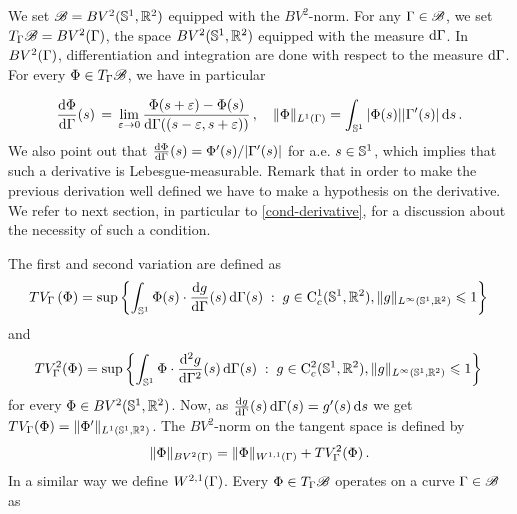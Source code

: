 \begin{defn}[{\bf $BV^2$-curves}]\label{BV2curves}
We set $\mathcal{B} = BV^2( \mathbb{S}^1, {\mathbb R}^2)$ equipped with the  $BV^2$-norm.
For any $\Gamma \in \mathcal{B}$, we set $T_\Gamma \mathcal{B} = BV^2(\Gamma)$, the space $BV^2(\mathbb{S}^1,\mathbb{R}^2)$ equipped with the measure  $\mathrm{d}\Gamma$.
In $BV^2(\Gamma)$, differentiation and integration are done with respect to the measure $\mathrm{d}\Gamma$. For every $\Phi \in T_\Gamma \mathcal{B}$, we have  in particular 

$$\frac{\mathrm{d} \Phi}{\mathrm{d} \Gamma}(s)\,=\, \underset{\varepsilon \rightarrow 0}{\lim} \, \frac{\Phi(s+\varepsilon)-\Phi(s)}{\mathrm{d} \Gamma((s-\varepsilon, s+\varepsilon))} \,,\quad \|\Phi\|_{L^1(\Gamma)} = \int_{\mathbb{S}^1} |\Phi(s)||\Gamma'(s)|\, \mathrm{d} s\,. $$
We also point out that $\frac{\mathrm{d} \Phi}{\mathrm{d} \Gamma}(s)= \Phi'(s)/|\Gamma'(s)|$ for a.e. $s\in \mathbb{S}^1$, which implies that such a derivative is Lebesgue-measurable. Remark that in order to make the previous derivation well defined we have to make a hypothesis  on the derivative. We refer to next section, in particular to \eqref{cond-derivative}, for a discussion about the necessity of such a condition.

The first and second variation are defined as
\begin{equation}\label{TV}
	 TV_\Gamma\left(\Phi\right) = \sup \left\{ 
		\int_{\mathbb{S}^1}\Phi(s)\cdot \frac{\mathrm{d} g}{\mathrm{d} \Gamma}(s)\, \mathrm{d}\Gamma(s) 
	 \;:\; 
		g\in \mathrm{C}^1_c(\mathbb{S}^1, \mathbb{R}^2),\|g\|_{L^\infty(\mathbb{S}^1,{\mathbb R}^2)}\leqslant 1
	 \right\} \,
\end{equation}
and 
 \begin{equation}
 TV^2_\Gamma(\Phi)=\sup \left\{ 
 	\int_{\mathbb{S}^1}\Phi\cdot \frac{\mathrm{d}^2 g}{\mathrm{d}\Gamma^2}(s)\, \mathrm{d} \Gamma(s) 
	 \;:\; 
		g\in \mathrm{C}^2_c({\mathbb{S}^1},\mathbb{R}^2 ),\|g\|_{L^{\infty}(\mathbb{S}^1,\mathbb{R}^2 )}\leqslant 1
	 \right\}\,
\end{equation}
for every $\Phi\in BV^2(\mathbb{S}^1,\mathbb{R}^2)$. Now, as $\frac{\mathrm{d} g}{\mathrm{d}\Gamma}(s)\, \mathrm{d}\Gamma(s)=g'(s)\,\mathrm{d} s$ we get $TV_\Gamma(\Phi) = \|\Phi'\|_{L^1(\mathbb{S}^1,\mathbb{R}^2)}$.   The $BV^2$-norm on the tangent space is defined by 
$$\|\Phi\|_{BV^2(\Gamma)} = \|\Phi\|_{W^{1,1}(\Gamma)} + TV^2_\Gamma(\Phi)\,.$$
In a similar way we define $W^{2,1}(\Gamma)$. Every $\Phi \in T_\Gamma \mathcal{B}$ operates on a curve $\Gamma \in \mathcal{B}$ as

\end{defn}


